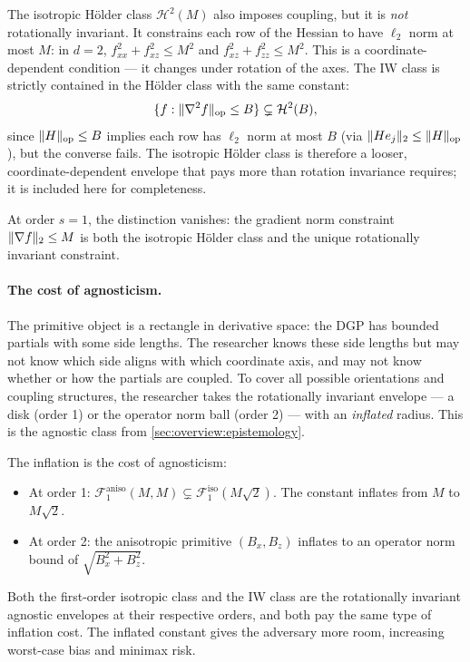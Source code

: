 The isotropic Hölder class $\mathcal{H}^2(M)$ also imposes coupling, but it is \emph{not} rotationally invariant.
It constrains each row of the Hessian to have $\ell_2$ norm at most $M$: in $d = 2$, $f_{xx}^2 + f_{xz}^2 \leq M^2$ and $f_{xz}^2 + f_{zz}^2 \leq M^2$.
This is a coordinate-dependent condition --- it changes under rotation of the axes.
The IW class is strictly contained in the Hölder class with the same constant:
\begin{equation*}
	\{ f : \lVert\nabla^2 f\rVert_{\mathrm{op}} \leq B \} \subsetneq \mathcal{H}^2(B),
\end{equation*}
since $\lVert H\rVert_{\mathrm{op}} \leq B$ implies each row has $\ell_2$ norm at most $B$ (via $\lVert H e_j\rVert_2 \leq \lVert H\rVert_{\mathrm{op}}$), but the converse fails.
The isotropic Hölder class is therefore a looser, coordinate-dependent envelope that pays more than rotation invariance requires; it is included here for completeness.

At order $s = 1$, the distinction vanishes: the gradient norm constraint $\lVert\nabla f\rVert_2 \leq M$ is both the isotropic Hölder class and the unique rotationally invariant constraint.

\paragraph{The cost of agnosticism.}
The primitive object is a rectangle in derivative space: the DGP has bounded partials with some side lengths.
The researcher knows these side lengths but may not know which side aligns with which coordinate axis, and may not know whether or how the partials are coupled.
To cover all possible orientations and coupling structures, the researcher takes the rotationally invariant envelope --- a disk (order 1) or the operator norm ball (order 2) --- with an \emph{inflated} radius.
This is the agnostic class from \cref{sec:overview:epistemology}.

The inflation is the cost of agnosticism:
\begin{itemize}
	\item At order 1: $\mathcal{F}_1^{\mathrm{aniso}}(M, M) \subsetneq \mathcal{F}_1^{\mathrm{iso}}(M\sqrt{2})$.
	The constant inflates from $M$ to $M\sqrt{2}$.
	\item At order 2: the anisotropic primitive $(B_x, B_z)$ inflates to an operator norm bound of $\sqrt{B_x^2 + B_z^2}$.
\end{itemize}
Both the first-order isotropic class and the IW class are the rotationally invariant agnostic envelopes at their respective orders, and both pay the same type of inflation cost.
The inflated constant gives the adversary more room, increasing worst-case bias and minimax risk.

